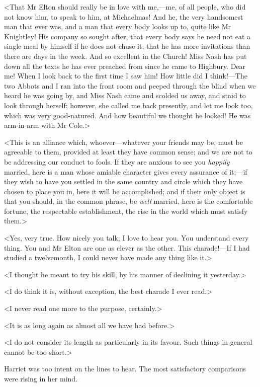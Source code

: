 <That Mr Elton should really be in love with me,—me, of all people, who did not know him, to speak to him, at Michaelmas! And he, the very handsomest man that ever was, and a man that every body looks up to, quite like Mr Knightley! His company so sought after, that every body says he need not eat a single meal by himself if he does not chuse it; that he has more invitations than there are days in the week. And so excellent in the Church! Miss Nash has put down all the texts he has ever preached from since he came to Highbury. Dear me! When I look back to the first time I saw him! How little did I think!—The two Abbots and I ran into the front room and peeped through the blind when we heard he was going by, and Miss Nash came and scolded us away, and staid to look through herself; however, she called me back presently, and let me look too, which was very good-natured. And how beautiful we thought he looked! He was arm-in-arm with Mr Cole.>

<This is an alliance which, whoever—whatever your friends may be, must be agreeable to them, provided at least they have common sense; and we are not to be addressing our conduct to fools. If they are anxious to see you \textit{happily} married, here is a man whose amiable character gives every assurance of it;—if they wish to have you settled in the same country and circle which they have chosen to place you in, here it will be accomplished; and if their only object is that you should, in the common phrase, be \textit{well} married, here is the comfortable fortune, the respectable establishment, the rise in the world which must satisfy them.>

<Yes, very true. How nicely you talk; I love to hear you. You understand every thing. You and Mr Elton are one as clever as the other. This charade!—If I had studied a twelvemonth, I could never have made any thing like it.>

<I thought he meant to try his skill, by his manner of declining it yesterday.>

<I do think it is, without exception, the best charade I ever read.>

<I never read one more to the purpose, certainly.>

<It is as long again as almost all we have had before.>

<I do not consider its length as particularly in its favour. Such things in general cannot be too short.>

Harriet was too intent on the lines to hear. The most satisfactory comparisons were rising in her mind.

